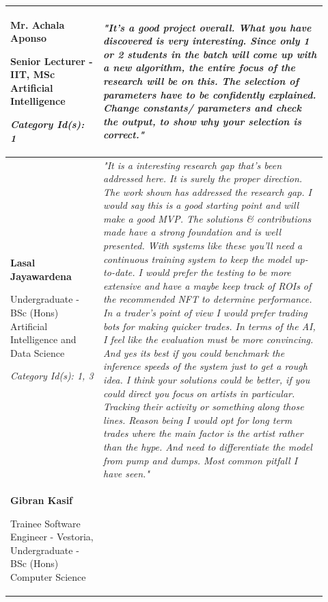 \begin{longtable}{|p{0.27\linewidth}|p{0.655\linewidth}|}
\hline
\textbf{Mr. Achala Aponso}

Senior Lecturer - IIT, MSc Artificial Intelligence 

\textit{Category Id(s): 1}
 & 
 \textit{"It's a good project overall. What you have discovered is very interesting.
Since only 1 or 2 students in the batch will come up with a new algorithm, the entire focus of the research will be on this.
The selection of parameters have to be confidently explained. Change constants/ parameters and check the output, to show why your selection is correct."}
 \\

\hline
\textbf{Lasal Jayawardena}

Undergraduate - BSc (Hons) Artificial Intelligence and Data Science

\textit{Category Id(s): 1, 3}
 & 
 \textit{"It is a interesting research gap that's been addressed here. It is surely the proper direction. The work shown has addressed the research gap. I would say this is a good starting point and will make a good MVP. The solutions \& contributions made have a strong foundation and is well presented. With systems like these you'll need a continuous training system to keep the model up-to-date. I would prefer the testing to be more extensive and have a maybe keep track of ROIs of the recommended NFT to determine performance.
 In a trader's point of view I would prefer trading bots for making quicker trades. In terms of the AI, I feel like the evaluation must be more convincing. And yes its best if you could benchmark the inference speeds of the system just to get a rough idea. 
I think your solutions could be better, if you could direct you focus on artists in particular. Tracking their activity or something along those lines. Reason being I would opt for long term trades where the main factor is the artist rather than the hype. And need to differentiate the model from pump and dumps. Most common pitfall I have seen."}
 \\
\hline
\textbf{Gibran Kasif}

Trainee Software Engineer - Vestoria,
Undergraduate - BSc (Hons) Computer Science


\end{longtable}
